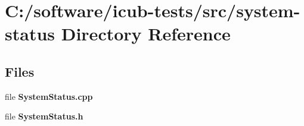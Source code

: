 \section{C\+:/software/icub-\/tests/src/system-\/status Directory Reference}
\label{dir_22920df90588b6b2fe85332a8ebd338b}
\subsection*{Files}
\begin{DoxyCompactItemize}
\item 
file {\bfseries System\+Status.\+cpp}
\item 
file {\bfseries System\+Status.\+h}
\end{DoxyCompactItemize}
